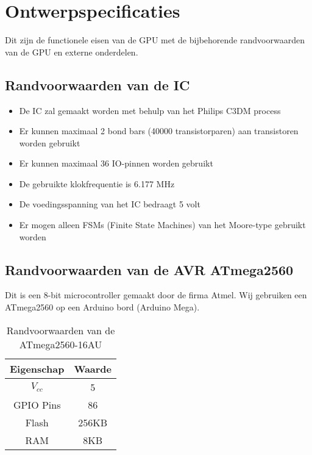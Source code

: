 \documentclass{scrreprt} %
\date{22 november 2013}
\begin{document}
\chapter{Ontwerpspecificaties}
Dit zijn de functionele eisen van de GPU met de bijbehorende randvoorwaarden van de GPU en externe onderdelen.

\section {Randvoorwaarden van de IC}
\begin {itemize}
\item De IC zal gemaakt worden met behulp van het Philips C3DM process \cite{epo3-manual}
\item Er kunnen maximaal 2 bond bars (40000 transistorparen) aan transistoren worden gebruikt
\item Er kunnen maximaal 36 IO-pinnen worden gebruikt
\item De gebruikte klokfrequentie is 6.177 MHz
\item De voedingsspanning van het IC bedraagt 5 volt
\item Er mogen alleen FSMs (Finite State Machines) van het Moore-type gebruikt worden
\end {itemize}

\section {Randvoorwaarden van de AVR ATmega2560}
Dit is een 8-bit microcontroller gemaakt door de firma Atmel. Wij gebruiken een ATmega2560 op een Arduino bord (Arduino Mega).
\begin{table}[H]
\centering
\caption{Randvoorwaarden van de ATmega2560-16AU\cite{AVR}}
\label{tab:spec-avr}
\begin{tabular}{c c}
	\hline\hline
 	Eigenschap & Waarde\\
 	\hline
	$V_{cc}$ & 5\volt \\
	GPIO Pins & 86 \\
	Flash & 256KB \\
	RAM & 8KB \\
  	\hline
\end{tabular}
\end{table} 
\end{document}
